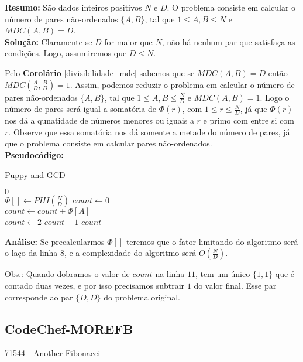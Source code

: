 \textbf{Resumo:}
São dados inteiros positivos $N$ e $D$. O problema consiste em calcular o número de pares não-ordenados $\{A,B\}$, tal que $1\leq A,B \leq N$ e $MDC(A,B)=D$.
\\

\textbf{Solução:}
Claramente se $D$ for maior que $N$, não há nenhum par que satisfaça as condições. Logo, assumiremos que $D \leq N$.

Pelo \textbf{Corolário} \autoref{divisibilidade_mdc} sabemos que se $MDC(A,B)=D$ então $MDC(\frac{A}{D}, \frac{B}{D})=1$. Assim, podemos reduzir o problema
em calcular o número de pares não-ordenados $\{A,B\}$, tal que $1\leq A,B \leq \frac{N}{D}$ e $MDC(A,B)=1$.
Logo o número de pares será igual a somatória de $\Phi(r)$, com $1 \leq r \leq \frac{N}{D}$, já que $\Phi(r)$ nos dá a qunatidade de números menores ou iguais a $r$ e primo com entre si com $r$. Observe que essa somatória nos dá somente a metade do número de pares, já que o problema consiste em calcular pares não-ordenados.
\\

\textbf{Pseudocódigo:}
\begin{algorithm}
\caption{Puppy and GCD}
\begin{algorithmic}[1]
\State \Return $0$
\EndIf
\\
\State $\Phi[] \gets PHI(\frac{N}{D})$
\State $count \gets 0$
\\
\State $count \gets count + \Phi[A]$
\EndFor
\\
\State $count \gets 2$ $count - 1$
\State \Return $count$
\EndProcedure
\end{algorithmic}
\end{algorithm}

\textbf{Análise:}
Se precalcularmos $\Phi[]$ teremos que o fator limitando do algoritmo será o laço da linha $8$, e a complexidade do algoritmo será $O(\frac{N}{D})$.

Obs.: Quando dobramos o valor de $count$ na linha $11$, tem um único $\{1,1\}$ que é contado duas vezes, e por isso precisamos subtrair $1$ do valor final. 
Esse par corresponde ao par $\{D,D\}$ do problema original.




\subsection{CodeChef-MOREFB}
\href{https://www.codechef.com/problems/MOREFB}{71544 - Another Fibonacci}\\

